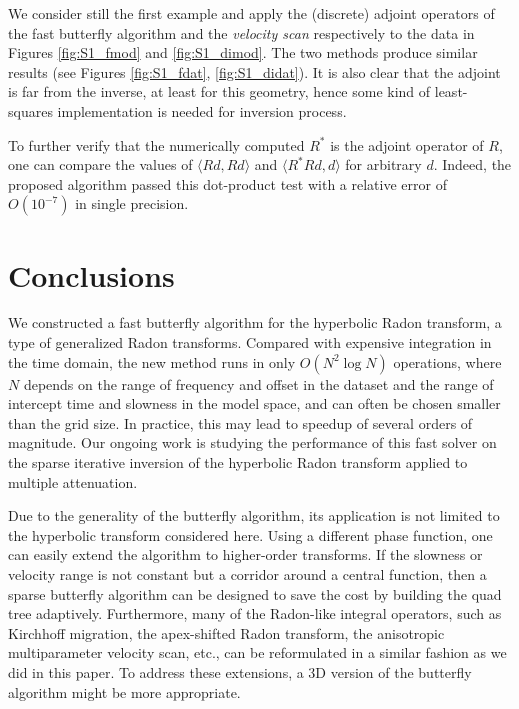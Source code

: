 We consider still the first example and apply the (discrete) adjoint operators of the fast butterfly algorithm and the {\it velocity scan} respectively to the data in Figures \ref{fig:S1_fmod} and \ref{fig:S1_dimod}. The two methods produce similar results (see Figures \ref{fig:S1_fdat}, \ref{fig:S1_didat}). It is also clear that the adjoint is far from the inverse, at least for this geometry, hence some kind of least-squares implementation is needed for inversion process.

To further verify that the numerically computed $R^*$ is the adjoint operator of $R$, one can compare the values of $\langle Rd,Rd\rangle$ and $\langle R^*Rd,d\rangle$ for arbitrary $d$. Indeed, the proposed algorithm passed this dot-product test with a relative error of $O(10^{-7})$ in single precision.





\section{Conclusions}

We constructed a fast butterfly algorithm for the hyperbolic Radon transform, a type of generalized Radon transforms. Compared with expensive integration in the time domain, the new method runs in only $O(N^2\log N)$ operations, where $N$ depends on the range of frequency and offset in the dataset and the range of intercept time and slowness in the model space, and can often be chosen smaller than the grid size. In practice, this may lead to speedup of several orders of magnitude. Our ongoing work is studying the performance of this fast solver on the sparse iterative inversion of the hyperbolic Radon transform applied to multiple attenuation.

Due to the generality of the butterfly algorithm, its application is not limited to the hyperbolic transform considered here. Using a different phase function, one can easily extend the algorithm to higher-order transforms. If the slowness or velocity range is not constant but a corridor around a central function, then a sparse butterfly algorithm can be designed to save the cost by building the quad tree adaptively. Furthermore, many of the Radon-like integral operators, such as Kirchhoff migration, the apex-shifted Radon transform, the anisotropic multiparameter velocity scan, etc., can be reformulated in a similar fashion as we did in this paper. To address these extensions, a 3D version of the butterfly algorithm might be more appropriate.

